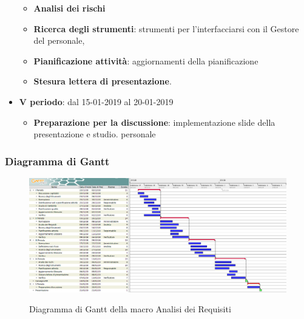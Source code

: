 \begin{itemize}
        	\begin{itemize}
    	        \item \textbf{Analisi dei rischi}
       	        \item \textbf{Ricerca degli strumenti}: strumenti per l'interfacciarsi con il Gestore del personale, 
       	        \item \textbf{Pianificazione attività}: aggiornamenti della pianificazione
       	        \item \textbf{Stesura lettera di presentazione}.
        	\end{itemize}
        	\item \textbf{V periodo}: dal 15-01-2019 al 20-01-2019
        	\begin{itemize}
    	        \item \textbf{Preparazione per la discussione}: implementazione slide della presentazione e studio. personale
        	\end{itemize}
		\end{itemize}
		
        \begin{landscape}
			\subsubsection{Diagramma di Gantt}        
			\begin{figure}[H]
					\centering
					\includegraphics[scale=0.425]{img/Analisi_dei_Requisiti.png}\\
					\caption{Diagramma di Gantt della macro Analisi dei Requisiti}
			\end{figure}
		\end{landscape}
		\newpage
